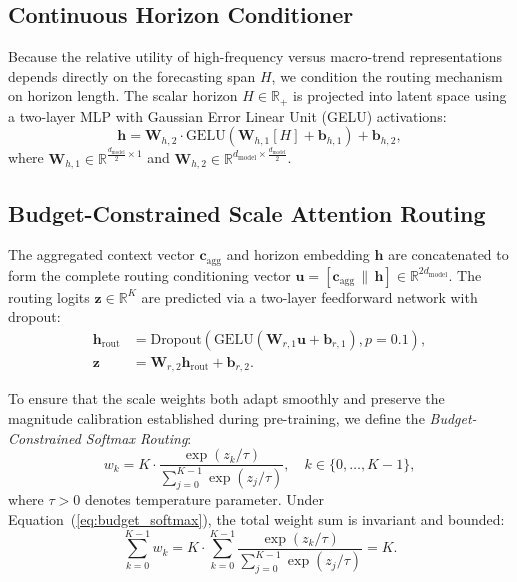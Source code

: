 \documentclass[journal]{IEEEtran}
\begin{document}
\subsection{Continuous Horizon Conditioner}
Because the relative utility of high-frequency versus macro-trend representations depends directly on the forecasting span $H$, we condition the routing mechanism on horizon length. The scalar horizon $H \in \mathbb{R}_+$ is projected into latent space using a two-layer MLP with Gaussian Error Linear Unit (GELU) activations:
\begin{equation}
\mathbf{h} = \mathbf{W}_{h,2} \cdot \text{GELU}\left(\mathbf{W}_{h,1} [H] + \mathbf{b}_{h,1}\right) + \mathbf{b}_{h,2},
\end{equation}
where $\mathbf{W}_{h,1} \in \mathbb{R}^{\frac{d_{\text{model}}}{2} \times 1}$ and $\mathbf{W}_{h,2} \in \mathbb{R}^{d_{\text{model}} \times \frac{d_{\text{model}}}{2}}$.

\subsection{Budget-Constrained Scale Attention Routing}
The aggregated context vector $\mathbf{c}_{\text{agg}}$ and horizon embedding $\mathbf{h}$ are concatenated to form the complete routing conditioning vector $\mathbf{u} = [\mathbf{c}_{\text{agg}} \,\|\, \mathbf{h}] \in \mathbb{R}^{2 d_{\text{model}}}$. The routing logits $\mathbf{z} \in \mathbb{R}^K$ are predicted via a two-layer feedforward network with dropout:
\begin{align}
\mathbf{h}_{\text{rout}} &= \text{Dropout}\left(\text{GELU}\left(\mathbf{W}_{r,1} \mathbf{u} + \mathbf{b}_{r,1}\right), p=0.1\right), \\
\mathbf{z} &= \mathbf{W}_{r,2} \mathbf{h}_{\text{rout}} + \mathbf{b}_{r,2}.
\end{align}

To ensure that the scale weights both adapt smoothly and preserve the magnitude calibration established during pre-training, we define the \textit{Budget-Constrained Softmax Routing}:
\begin{equation}
\label{eq:budget_softmax}
w_k = K \cdot \frac{\exp\left(z_k / \tau\right)}{\sum_{j=0}^{K-1} \exp\left(z_j / \tau\right)}, \quad k \in \{0, \dots, K-1\},
\end{equation}
where $\tau > 0$ denotes temperature parameter. Under Equation~(\ref{eq:budget_softmax}), the total weight sum is invariant and bounded:
\begin{equation}
\sum_{k=0}^{K-1} w_k = K \cdot \sum_{k=0}^{K-1} \frac{\exp\left(z_k / \tau\right)}{\sum_{j=0}^{K-1} \exp\left(z_j / \tau\right)} = K.
\end{equation}
\end{document}
